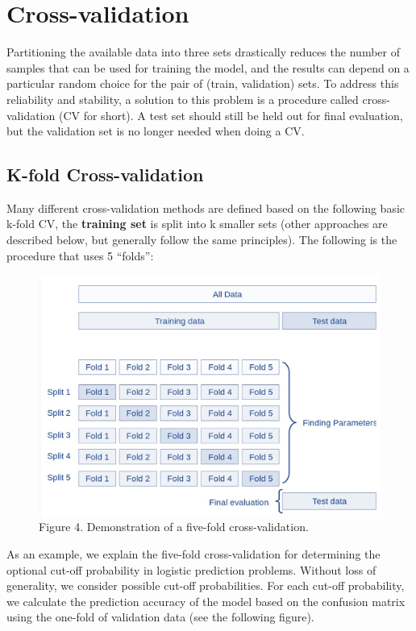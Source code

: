 \documentclass[
]{book}
\begin{document}
\hypertarget{cross-validation}{%
\section{Cross-validation}\label{cross-validation}}

Partitioning the available data into three sets drastically reduces the number of samples that can be used for training the model, and the results can depend on a particular random choice for the pair of (train, validation) sets. To address this reliability and stability, a solution to this problem is a procedure called cross-validation (CV for short). A test set should still be held out for final evaluation, but the validation set is no longer needed when doing a CV.

\hypertarget{k-fold-cross-validation}{%
\subsection{K-fold Cross-validation}\label{k-fold-cross-validation}}

Many different cross-validation methods are defined based on the following basic k-fold CV, the \textbf{training set} is split into k smaller sets (other approaches are described below, but generally follow the same principles). The following is the procedure that uses 5 ``folds'':

\begin{figure}[h]

{\centering \includegraphics[width=0.8\linewidth]{img06/w06-5-fold-CV} 

}

\caption{Figure 4.  Demonstration of a five-fold cross-validation.}\label{fig:unnamed-chunk-120}
\end{figure}

As an example, we explain the five-fold cross-validation for determining the optional cut-off probability in logistic prediction problems. Without loss of generality, we consider possible cut-off probabilities. For each cut-off probability, we calculate the prediction accuracy of the model based on the confusion matrix using the one-fold of validation data (see the following figure).
\end{document}
